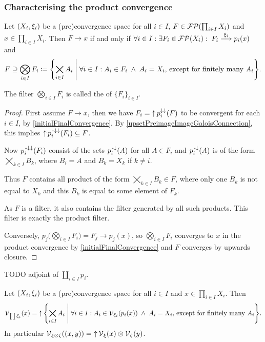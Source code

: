 \subsubsection{Characterising the product convergence}
\begin{proposition} \label{convergenceProductFilter}
Let $\left( X_i, \xi_i \right)$ be a (pre)convergence space for all $i\in I$, $F \in \operatorname{\mathcal{FP}}(\prod_{i\in I}X_i)$ and $x\in \prod_{i\in I}X_i$. Then $F\to x$ \textup{if and only if} $\forall i\in I: \exists F_i\in \operatorname{\mathcal{FP}}(X_i): 
\; F_i \overset{\xi_i}{\longrightarrow} p_i(x)$ and
\[ F \supseteq \bigotimes_{i\in I}F_i \defeq \setbuilder{\bigtimes_{i\in I}A_i}{\forall i\in I: A_i \in F_i \;\land\; A_i = X_i, \,\text{except for finitely many $A_i$}}. \]
\end{proposition}
The filter $\bigotimes_{i\in I}F_i$ is called the  of $\{F_i\}_{i\in I}$.
\begin{proof}
First assume $F\to x$, then we have $F_i = \operatorname{\uparrow} p_i^{\downarrow\downarrow}(F)$ to be convergent for each $i\in I$, by \ref{initialFinalConvergence}. By \ref{upsetPreimageImageGaloisConnection}, this implies $\operatorname{\uparrow} p_i^{{\text{\hspace{0.15em}-}\downarrow}\downarrow}(F_i) \subseteq F$.

Now $p_i^{{\text{\hspace{0.15em}-}\downarrow}\downarrow}(F_i)$ consist of the sets $p_i^{\text{\hspace{0.15em}-}\downarrow}(A)$ for all $A\in F_i$ and $p_i^{\text{\hspace{0.15em}-}\downarrow}(A)$ is of the form $\bigtimes_{k\in I}B_k$, where $B_i = A$ and $B_k = X_k$ if $k \neq i$.

Thus $F$ contains all product of the form $\bigtimes_{k\in I}B_k \in F$, where only one $B_k$ is not equal to $X_k$ and this $B_k$ is equal to some element of $F_k$.

As $F$ is a filter, it also contains the filter generated by all such products. This filter is exactly the product filter.

Conversely, $p_j\Big(\bigotimes_{i\in I}F_i\Big) = F_j \to p_j(x)$, so $\bigotimes_{i\in I}F_i$ converges to $x$ in the product convergence by \ref{initialFinalConvergence} and $F$ converges by upwards closure.
\end{proof}
TODO adjoint of $\coprod_{i\in I}p_i$.
\begin{corollary} \label{productVicinity}
Let $\left( X_i, \xi_i \right)$ be a (pre)convergence space for all $i\in I$ and $x\in \prod_{i\in I}X_i$. Then
\[\vicinity_{\prod \xi_i}(x) = \upset \setbuilder{\bigtimes_{i\in I}A_i}{\forall i\in I: A_i \in \vicinity_{\xi_i}(p_i(x)) \;\land\; A_i = X_i, \,\text{except for finitely many $A_i$}}. \]
In particular $\operatorname{\mathcal{V}}_{\xi\otimes \zeta}((x,y)) = \operatorname{\uparrow} \operatorname{\mathcal{V}}_\xi(x)\otimes \operatorname{\mathcal{V}}_\zeta(y)$.
\end{corollary}

